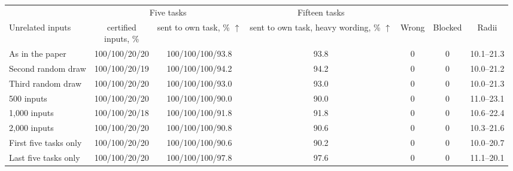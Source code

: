 \begin{tabular}{lcccccc}
    \toprule
    & \multicolumn{2}{c}{Five tasks} & Fifteen tasks & & & \\
    \cmidrule(lr){2-3} \cmidrule(lr){4-4}
    Unrelated inputs & \shortstack[c]{certified\\inputs, \%} & \shortstack[c]{sent to own\\task, \% $\uparrow$} & \shortstack[c]{sent to own task,\\heavy wording, \% $\uparrow$} & Wrong & Blocked & Radii \\
    \midrule
    As in the paper & 100/100/20/20 & 100/100/100/93.8 & 93.8 & 0 & 0 & 10.1--21.3 \\
    \midrule
    Second random draw & 100/100/20/19 & 100/100/100/94.2 & 94.2 & 0 & 0 & 10.0--21.2 \\
    Third random draw & 100/100/20/20 & 100/100/100/93.0 & 93.0 & 0 & 0 & 10.0--21.3 \\
    500 inputs & 100/100/20/20 & 100/100/100/90.0 & 90.0 & 0 & 0 & 11.0--23.1 \\
    1{,}000 inputs & 100/100/20/18 & 100/100/100/91.8 & 91.8 & 0 & 0 & 10.6--22.4 \\
    2{,}000 inputs & 100/100/20/20 & 100/100/100/90.8 & 90.6 & 0 & 0 & 10.3--21.6 \\
    First five tasks only & 100/100/20/20 & 100/100/100/90.6 & 90.2 & 0 & 0 & 10.0--20.7 \\
    Last five tasks only & 100/100/20/20 & 100/100/100/97.8 & 97.6 & 0 & 0 & 11.1--20.1 \\
    \bottomrule
\end{tabular}
